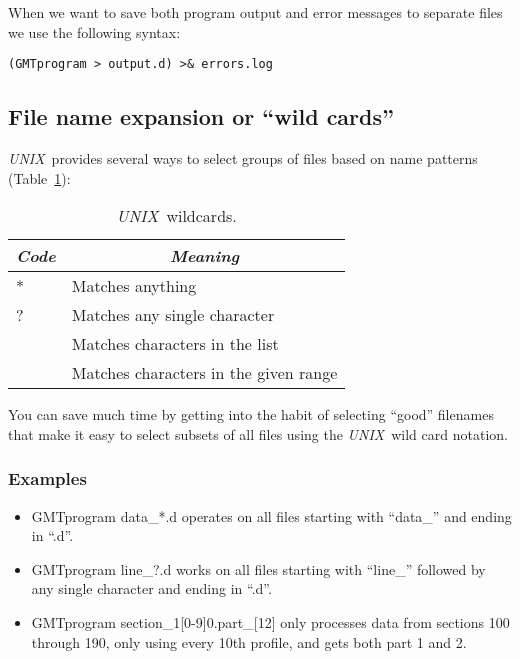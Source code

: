 \documentclass{report}
\newcommand{\UNIX}{\textit{UNIX}}
\begin{document}
When we want to save both program output and error messages to
separate files we use the following syntax:

\begin{verbatim}
(GMTprogram > output.d) >& errors.log
\end{verbatim}

\subsection{File name expansion or ``wild cards''}
\index{UNIX@\UNIX!``wild cards''}

\UNIX\ provides several ways to select groups of files based
on name patterns (Table~\ref{tbl:wildcard}):

\begin{table}[h]
\small
\centering
\begin{tabular}{|l|l|} \hline
\multicolumn{1}{|c|}{\emph{Code}} & \multicolumn{1}{c|}{\emph{Meaning}} \\ \hline
*	&	Matches anything \\ \hline
?	&	Matches any single character \\ \hline
[\emph{list}]	&	Matches characters in the list \\ \hline
[\emph{range}]	&	Matches characters in the given range \\ \hline
\end{tabular}
\caption{\UNIX\ wildcards.} \label{tbl:wildcard}
\end{table}
 
\noindent
You can save much time by getting into the habit of selecting
``good'' filenames that make it easy to select subsets of all
files using the \UNIX\ wild card notation.

\subsubsection{Examples}

\begin{itemize}
\item GMTprogram data\_*.d operates on all files starting with
``data\_'' and ending in ``.d''.

\item GMTprogram line\_?.d works on all files starting with
``line\_'' followed by any single character and ending in ``.d''.

\item GMTprogram section\_1[0-9]0.part\_[12] only processes data
from sections 100 through 190, only using every 10th profile, and
gets both part 1 and 2.

\end{itemize} 
\end{document}
